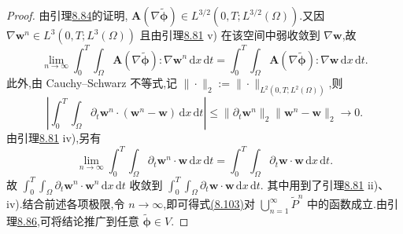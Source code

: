 \begin{lemma}[两个试验函数的弱方程之差的估计]
\begin{proof}
由引理\hyperref[lem:smagorinsky-limiting-equation]{8.84}的证明,
$\bm{A}(\nabla\widetilde{\symbf{\phi}})\in L^{3/2}(0,T;L^{3/2}(\Omega))$.又因
$\nabla\bm{w}^n\in L^3(0,T;L^3(\Omega))$ 且由引理\hyperref[lem:smagorinsky-convergent-subsequence]{8.81} v) 在该空间中弱收敛到 $\nabla\bm{w}$,故
\[
 \lim_{n\to\infty}\int_0^T\int_\Omega
       \bm{A}(\nabla\widetilde{\symbf{\phi}}):\nabla\bm{w}^n
                                    \,\mathrm{d}x\,\mathrm{d}t
 =\int_0^T\int_\Omega
       \bm{A}(\nabla\widetilde{\symbf{\phi}}):\nabla\bm{w}
                                    \,\mathrm{d}x\,\mathrm{d}t.
\]
此外,由 Cauchy--Schwarz 不等式,记
$\|\cdot\|_2:=\|\cdot\|_{L^2(0,T;L^2(\Omega))}$,则
\[
 \left|\int_0^T\int_\Omega
       \partial_t\bm{w}^n\cdot(\bm{w}^n-\bm{w})
                         \,\mathrm{d}x\,\mathrm{d}t\right|
 \le\|\partial_t\bm{w}^n\|_2
       \|\bm{w}^n-\bm{w}\|_2\longrightarrow0.
\]
由引理\hyperref[lem:smagorinsky-convergent-subsequence]{8.81} iv),另有
\[
 \lim_{n\to\infty}\int_0^T\int_\Omega
       \partial_t\bm{w}^n\cdot\bm{w}\,\mathrm{d}x\,\mathrm{d}t
 =\int_0^T\int_\Omega
       \partial_t\bm{w}\cdot\bm{w}\,\mathrm{d}x\,\mathrm{d}t.
\]
故 $\int_0^T\int_\Omega\partial_t\bm{w}^n\cdot\bm{w}^n\,\mathrm{d}x\,\mathrm{d}t$
收敛到 $\int_0^T\int_\Omega\partial_t\bm{w}\cdot\bm{w}\,\mathrm{d}x\,\mathrm{d}t$.
其中用到了引理\hyperref[lem:smagorinsky-convergent-subsequence]{8.81} ii)、iv).结合前述各项极限,令 $n\to\infty$,即可得式\hyperref[eq:smagorinsky-weak-equation-difference]{(8.103)}对 $\bigcup_{n=1}^{\infty}\widetilde{P}^n$ 中的函数成立.由引理\hyperref[lem:smagorinsky-limiting-equation-in-v]{8.86},可将结论推广到任意 $\widetilde{\symbf{\phi}}\in V$.
\end{proof}
\end{lemma}

